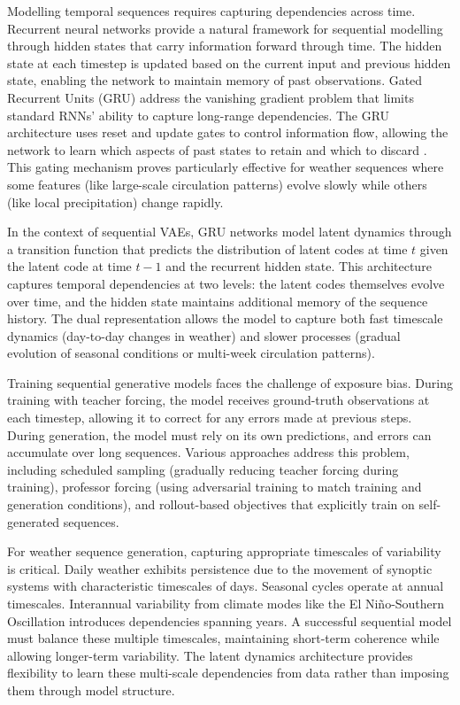 Modelling temporal sequences requires capturing dependencies across time. Recurrent neural 
networks provide a natural framework for 
sequential modelling through hidden states that carry information forward through time. The 
hidden state at each timestep is updated based on the current input and previous hidden state, 
enabling the network to maintain memory of past observations. Gated Recurrent Units (GRU) 
address the vanishing gradient problem that limits standard RNNs' ability to 
capture long-range dependencies. The GRU architecture uses reset and update gates to control 
information flow, allowing the network to learn which aspects of past states to retain and 
which to discard \cite{GRU}. This gating mechanism proves particularly effective for weather sequences 
where some features (like large-scale circulation patterns) evolve slowly while others (like 
local precipitation) change rapidly.

In the context of sequential VAEs, GRU networks model latent dynamics through a transition 
function that predicts the distribution of latent codes at time $t$ given the latent code at 
time $t-1$ and the recurrent hidden state. This architecture captures temporal dependencies at 
two levels: the latent codes themselves evolve over time, and the hidden state maintains 
additional memory of the sequence history. The dual representation allows the model to capture 
both fast timescale dynamics (day-to-day changes in weather) and slower processes (gradual 
evolution of seasonal conditions or multi-week circulation patterns).

Training sequential generative models faces the challenge of exposure bias. During training 
with teacher forcing, the model receives ground-truth observations at each timestep, allowing 
it to correct for any errors made at previous steps. During generation, the model must rely on 
its own predictions, and errors can accumulate over long sequences. Various approaches address 
this problem, including scheduled sampling (gradually reducing teacher forcing during training), 
professor forcing (using adversarial training to match training and generation conditions), 
and rollout-based objectives that explicitly train on self-generated sequences.

For weather sequence generation, capturing appropriate timescales of variability is critical. 
Daily weather exhibits persistence due to the movement of synoptic systems with characteristic 
timescales of days. Seasonal cycles operate at annual timescales. Interannual variability from 
climate modes like the El Niño-Southern Oscillation introduces dependencies spanning years. A 
successful sequential model must balance these multiple timescales, maintaining short-term 
coherence while allowing longer-term variability. The latent dynamics architecture provides 
flexibility to learn these multi-scale dependencies from data rather than imposing them through 
model structure.

